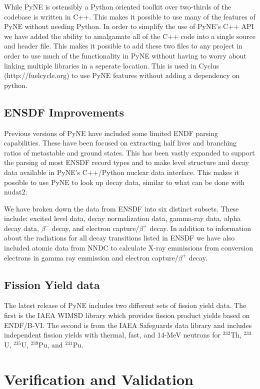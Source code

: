 \documentclass{anstrans}
\begin{document}
While PyNE is ostensibly a Python oriented toolkit over two-thirds 
of the codebase is written in C++. This makes it possible to use many 
of the features of PyNE without needing Python. In order to simplify 
the use of PyNE's C++ API we have added the ability to amalgamate all 
of the C++ code into a single source and header file. This makes it 
possible to add these two files to any project in order to use much of the 
functionality in PyNE without having to worry about linking multiple 
libraries in a seperate location. This is used in Cyclus (http://fuelcycle.org)
 to use PyNE features without adding a dependency on python.

\subsection{ENSDF Improvements}

Previous versions of PyNE have included some limited ENDF parsing capabilities. 
These have been focused on extracting half lives and branching ratios of 
metastable and ground states. This has been vastly expanded to support the 
parsing of most ENSDF record types and to make level structure and decay data 
available in PyNE's C++/Python nuclear data interface. This makes it possible 
to use PyNE to look up decay data, similar to what can be done with nudat2. 

We have broken down the data from ENSDF into six distinct subsets. These 
include: excited level data, decay normalization data, gamma-ray data, alpha 
decay data, $\beta^-$ decay, and electron capture/$\beta^+$ decay. In addition 
to information about the radiations for all decay transitions listed in ENSDF we 
have also included atomic data from NNDC to calculate X-ray emmissions from 
conversion electrons in gamma ray emmission and electron capture/$\beta^+$ decay.

\subsection{Fission Yield data}

The latest release of PyNE includes two different sets of fission yield data. 
The first is the IAEA WIMSD library which provides fission product yields 
based on ENDF/B-VI. The second is from the IAEA Safeguards data library and includes 
independent fission yields with thermal, fast, and 14-MeV neutrons for $^{232}$Th, 
$^{233}$U, $^{235}$U, $^{239}$Pu, and $^{241}$Pu.

\section{Verification and Validation}
\end{document}
